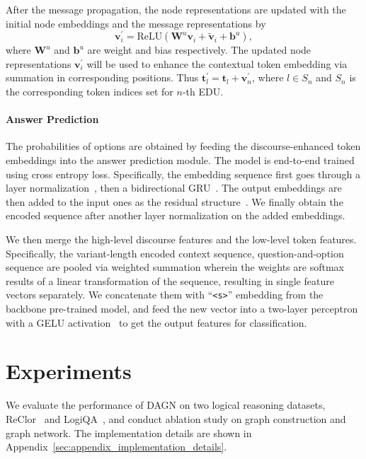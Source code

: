 \documentclass[11pt]{article}
\newcommand{\moe}[1]{{\color{black} #1}}
\begin{document}
After the message propagation, the node representations are updated with the initial node embeddings and the message representations by
\begin{equation}
    \mathbf{v}^{\prime}_i = \text{ReLU}(\mathbf{W}^{u}\mathbf{v}_i + \tilde{\mathbf{v}}_i + \mathbf{b}^{u}),
\end{equation}
where $\mathbf{W}^{u}$ and $\mathbf{b}^{u}$ are weight and bias respectively.
The updated node representations $\mathbf{v}^{\prime}_i$ will be used to enhance the contextual token embedding via summation in corresponding positions. Thus $\mathbf{t}_l^{\prime} = \mathbf{t}_l + \mathbf{v}^{\prime}_n$, where $l \in S_n$ and $S_n$ is the corresponding token indices set for $n$-th EDU.

\paragraph{Answer Prediction}
\moe{
The probabilities of options are obtained by feeding the discourse-enhanced token embeddings into the answer prediction module.
The model is end-to-end trained using cross entropy loss.}
Specifically, the embedding sequence first goes through a layer normalization~\cite{ba2016layer}, then a bidirectional GRU~\cite{cho2014properties}. The output embeddings are then added to the input ones as the residual structure~\cite{he2016deep}. 
We finally obtain the encoded sequence after another layer normalization on the added embeddings.


We then merge the high-level discourse features and the low-level token features.
Specifically, the variant-length encoded context sequence, question-and-option sequence are pooled via weighted summation wherein the weights are softmax results of a linear transformation of the sequence,
resulting in single feature vectors separately. 
We concatenate them with ``\texttt{<s>}'' embedding from the backbone pre-trained model, and feed the new vector into a two-layer perceptron with a GELU activation~\cite{hendrycks2016gaussian}
to get the output features for classification.
















\section{Experiments}
\vspace{-1mm}
We evaluate the performance of DAGN on two logical reasoning datasets, ReClor~\cite{yu2020reclor} and LogiQA~\cite{liu2020logiqa}, and conduct ablation study on graph construction and graph network. The implementation details are shown in Appendix~\ref{sec:appendix_implementation_details}.
\end{document}
